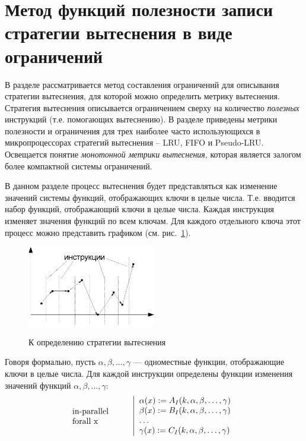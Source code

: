 \documentclass[14pt]{extreport}
\newcommand{\LRU}{\textsf{LRU}\xspace}
\newcommand{\FIFO}{\textsf{FIFO}\xspace}
\newcommand{\PseudoLRU}{\textsf{Pseudo-LRU}\xspace}
\begin{document}

\pagebreak
\section{Метод функций полезности записи стратегии вытеснения в виде
ограничений}\label{sec:usefulness_functions}

{\footnotesize В разделе рассматривается метод составления ограничений для описывания
стратегии вытеснения, для которой можно определить метрику
вытеснения. Стратегия вытеснения описывается ограничением сверху на
количество \emph{полезных} инструкций (т.е. помогающих вытеснению).
В разделе приведены метрики полезности и ограничения для трех
наиболее часто использующихся в микропроцессорах стратегий
вытеснения -- \LRU, \FIFO и \PseudoLRU. Освещается понятие
\emph{монотонной метрики вытеснения}, которая является залогом более
компактной системы ограничений.}

В данном разделе процесс вытеснения будет представляться как изменение значений системы функций, отображающих ключи в целые числа. Т.е. вводится набор функций, отображающий ключи в целые числа. Каждая инструкция изменяет значения функций по всем ключам. Для каждого отдельного ключа этот процесс можно представить графиком (см. рис.~\ref{fig:graphic}).

\begin{figure}[h] \center
  \includegraphics[width=0.5\textwidth]{2.theor/graphic}\\
  \caption{К определению стратегии вытеснения}\label{fig:graphic}
\end{figure}

Говоря формально, пусть $\alpha, \beta, \dots, \gamma$ --- одноместные функции, отображающие ключи в целые числа. Для каждой инструкции определены функции изменения значений функций $\alpha, \beta, \dots, \gamma$:
$$\parbox{2.5cm}{in-parallel\\forall x~}\left|\begin{array}{l}
\alpha(x) := A_I(k, \alpha, \beta, \dots, \gamma)\\
\beta(x) := B_I(k, \alpha, \beta, \dots, \gamma)\\
\dots\\
\gamma(x) := C_I(k, \alpha, \beta, \dots, \gamma)\\
\end{array}\right.
$$
\end{document}
